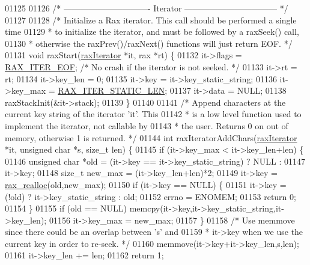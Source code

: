 \begin{DoxyCode}
{{{{{{{{{{{{{{{{{{01125 
01126 \textcolor{comment}{/* ------------------------------- Iterator --------------------------------- */}
01127 
01128 \textcolor{comment}{/* Initialize a Rax iterator. This call should be performed a single time}
01129 \textcolor{comment}{ * to initialize the iterator, and must be followed by a raxSeek() call,}
01130 \textcolor{comment}{ * otherwise the raxPrev()/raxNext() functions will just return EOF. */}
01131 \textcolor{keywordtype}{void} raxStart(\hyperlink{structraxIterator}{raxIterator} *it, rax *rt) \{
01132     it->flags = \hyperlink{rax_8h_a4fb08a914b84ba0a39daa86297176e1c}{RAX\_ITER\_EOF}; \textcolor{comment}{/* No crash if the iterator is not seeked. */}
01133     it->rt = rt;
01134     it->key\_len = 0;
01135     it->key = it->key\_static\_string;
01136     it->key\_max = \hyperlink{rax_8h_a172e740ce3572b21018192e7877217dd}{RAX\_ITER\_STATIC\_LEN};
01137     it->data = NULL;
01138     raxStackInit(&it->stack);
01139 \}
01140 
01141 \textcolor{comment}{/* Append characters at the current key string of the iterator 'it'. This}
01142 \textcolor{comment}{ * is a low level function used to implement the iterator, not callable by}
01143 \textcolor{comment}{ * the user. Returns 0 on out of memory, otherwise 1 is returned. */}
01144 \textcolor{keywordtype}{int} raxIteratorAddChars(\hyperlink{structraxIterator}{raxIterator} *it, \textcolor{keywordtype}{unsigned} \textcolor{keywordtype}{char} *s, size\_t len) \{
01145     \textcolor{keywordflow}{if} (it->key\_max < it->key\_len+len) \{
01146         \textcolor{keywordtype}{unsigned} \textcolor{keywordtype}{char} *old = (it->key == it->key\_static\_string) ? NULL :
01147                                                                   it->key;
01148         size\_t new\_max = (it->key\_len+len)*2;
01149         it->key = \hyperlink{rax__malloc_8h_a4aa041a0e1eaa6d8476e889547280467}{rax\_realloc}(old,new\_max);
01150         \textcolor{keywordflow}{if} (it->key == NULL) \{
01151             it->key = (!old) ? it->key\_static\_string : old;
01152             errno = ENOMEM;
01153             \textcolor{keywordflow}{return} 0;
01154         \}
01155         \textcolor{keywordflow}{if} (old == NULL) memcpy(it->key,it->key\_static\_string,it->key\_len);
01156         it->key\_max = new\_max;
01157     \}
01158     \textcolor{comment}{/* Use memmove since there could be an overlap between 's' and}
01159 \textcolor{comment}{     * it->key when we use the current key in order to re-seek. */}
01160     memmove(it->key+it->key\_len,s,len);
01161     it->key\_len += len;
01162     \textcolor{keywordflow}{return} 1;
}}}}}}}}}}}}}}}}}}
\end{DoxyCode}
